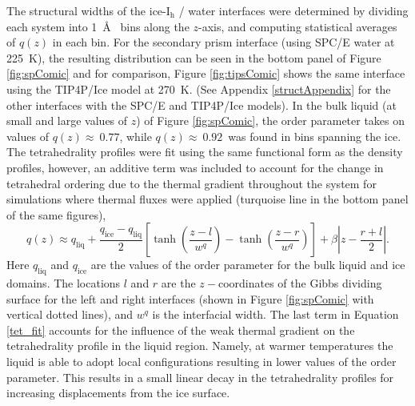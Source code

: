 The structural widths of the ice-I$_\mathrm{h}$ / water interfaces
were determined by dividing each system into 1~\AA~ bins along the
$z$-axis, and computing statistical averages of $q(z)$ in each
bin. For the secondary prism interface (using SPC/E water at 225~K),
the resulting distribution can be seen in the bottom panel of
Figure \ref{fig:spComic} and for comparison, Figure \ref{fig:tipsComic}
shows the same interface using the TIP4P/Ice model at 270~K.  (See
Appendix \ref{structAppendix} for the other interfaces with the SPC/E
and TIP4P/Ice models). In the bulk liquid (at small and large values
of $z$) of Figure \ref{fig:spComic}, the order parameter takes on values
of $q(z) \approx~0.77$, while $q(z) \approx~0.92$~was found in bins
spanning the ice. The tetrahedrality profiles were fit using the same
functional form as the density profiles, however, an additive term was
included to account for the change in tetrahedral ordering due to the
thermal gradient throughout the system for simulations where thermal
fluxes were applied (turquoise line in the bottom panel of the same
figures),
\begin{equation}\label{tet_fit}
q(z) \approx
q_\mathrm{liq}+\frac{q_\mathrm{ice}-q_\mathrm{liq}}{2}\left[\tanh\left(\frac{z-l}{w^q}\right)-\tanh\left(\frac{z-r}{w^q}\right)\right]+\beta\left|z-\frac{r+l}{2}\right|.
\end{equation}
Here $q_\mathrm{liq}$ and $q_\mathrm{ice}$ are the values of the order
parameter for the bulk liquid and ice domains. The locations $l$ and
$r$ are the $z-$coordinates of the Gibbs dividing surface for the left
and right interfaces (shown in Figure \ref{fig:spComic} with vertical
dotted lines), and $w^{q}$ is the interfacial width.  The last term in
Equation \eqref{tet_fit} accounts for the influence of the weak thermal
gradient on the tetrahedrality profile in the liquid region. Namely,
at warmer temperatures the liquid is able to adopt local
configurations resulting in lower values of the order parameter. This
results in a small linear decay in the tetrahedrality profiles for
increasing displacements from the ice surface.

